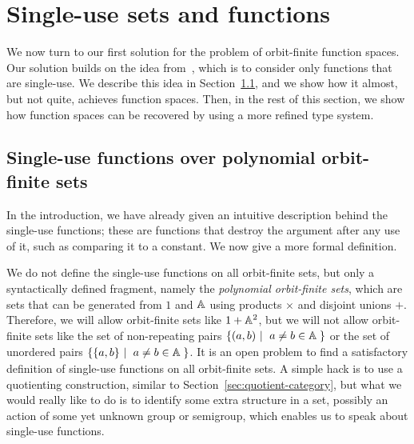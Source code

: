\section{Single-use sets and functions}
\label{sec:single-use-sets}
We now turn to our first solution for the problem of orbit-finite function spaces.  Our solution builds on the idea from~\cite[Section 2.2]{stefanski-phd}, which is to consider only functions that are single-use. We describe this idea in Section~\ref{sec:single-use-functions-over-polynomial-orbit-finite-sets}, and we show how it almost, but not quite, achieves function spaces. Then, in the rest of this section, we show how function spaces can be recovered by using a more refined type system. 

\subsection{Single-use functions over polynomial orbit-finite sets}
\label{sec:single-use-functions-over-polynomial-orbit-finite-sets}

In the introduction, we have already given an intuitive description behind the single-use functions; these are functions that destroy the argument after any use of it, such as comparing it to a constant. We now give a more formal definition.

We do not define the single-use functions on all orbit-finite sets, but only a syntactically defined fragment, namely the \emph{polynomial orbit-finite sets}, which are sets that can be generated from $1$ and $\mathbb A$ using  
 products $\times$ and disjoint unions $+$. Therefore, we will allow orbit-finite sets like $1 + \mathbb A^2$, but we will not allow orbit-finite sets like 
the set of non-repeating pairs
$\setbuild{(a,b)}{$a \neq b \in \atoms$}$ or the set of unordered pairs $\setbuild{\set{a,b}}{$a \neq b \in \atoms$}$. It is an open problem to find a satisfactory definition of single-use functions on all orbit-finite sets. A simple hack is to use a quotienting construction, similar to Section~\ref{sec:quotient-category}, but what we would really like to do is to identify some extra structure in a set, possibly an action of some yet unknown group or semigroup, which enables us to speak about single-use functions.

